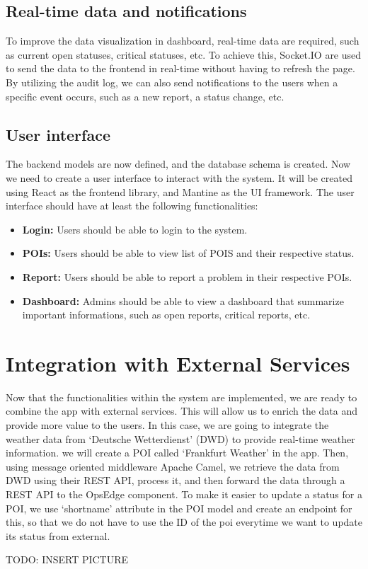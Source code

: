 \subsection{Real-time data and notifications}
\label{subsec:internship_experience:realtime_data_notifications}

To improve the data visualization in dashboard, real-time data are required, such as current open statuses, critical statuses, etc. To achieve this, Socket.IO are used to send the data to the frontend in real-time without having to refresh the page. By utilizing the audit log, we can also send notifications to the users when a specific event occurs, such as a new report, a status change, etc.

\subsection{User interface}

The backend models are now defined, and the database schema is created. Now we need to create a user interface to interact with the system. It will be created using React as the frontend library, and Mantine as the UI framework. The user interface should have at least the following functionalities:

\begin{itemize}
    \item \textbf{Login:} Users should be able to login to the system.
    \item \textbf{POIs:} Users should be able to view list of POIS and their respective status.
    \item \textbf{Report:} Users should be able to report a problem in their respective POIs.
    \item \textbf{Dashboard:} Admins should be able to view a dashboard that summarize important informations, such as open reports, critical reports, etc.
\end{itemize}

\section{Integration with External Services}
\label{sec:internship_experience:integration_external_services}

Now that the functionalities within the system are implemented, we are ready to combine the app with external services. This will allow us to enrich the data and provide more value to the users. In this case, we are going to integrate the weather data from `Deutsche Wetterdienst' (DWD) to provide real-time weather information. we will create a POI called `Frankfurt Weather' in the app. Then, using message oriented middleware Apache Camel, we retrieve the data from DWD using their REST API\@, process it, and then forward the data through a REST API to the OpsEdge component. To make it easier to update a status for a POI, we use `shortname' attribute in the POI model and create an endpoint for this, so that we do not have to use the ID of the poi everytime we want to update its status from external.

TODO: INSERT PICTURE